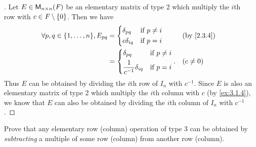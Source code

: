 \begin{proof}[]
  Let \(E \in \mathsf{M}_{{n} \times n}({\mathit{F}})\) be an elementary matrix of type 2 which multiply the \(i\)th row with \(c \in \mathit{F} \setminus \left\lbrace0\right\rbrace\).
  Then we have
  \begin{align*}
    \forall p, q \in \set{1, \dots, n}, E_{p q} & = \begin{dcases}
                                                      \delta_{p q}   & \text{if } p \neq i \\
                                                      c \delta_{i q} & \text{if } p = i
                                                    \end{dcases}                                      &  & \text{(by \cref{2.3.4})} \\
                                                & = \begin{dcases}
                                                      \delta_{p q}                  & \text{if } p \neq i \\
                                                      \frac{1}{c^{-1}} \delta_{i q} & \text{if } p = i
                                                    \end{dcases}. &  & (c \neq 0)
  \end{align*}
  Thus \(E\) can be obtained by dividing the \(i\)th row of \(I_n\) with \(c^{-1}\).
  Since \(E\) is also an elementary matrix of type 2 which multiply the \(i\)th column with \(c\) (by \cref{ex:3.1.4}), we know that \(E\) can also be obtained by dividing the \(i\)th column of \(I_n\) with \(c^{-1}\).
\end{proof}

\begin{ex}\label{ex:3.1.11}
  Prove that any elementary row (column) operation of type 3 can be obtained by \emph{subtracting} a multiple of some row (column) from another row (column).
\end{ex}

